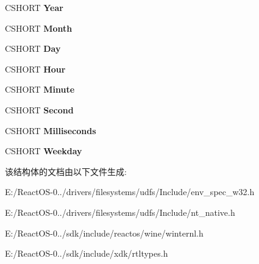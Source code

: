 \begin{DoxyCompactItemize}
\mbox{\label{struct___t_i_m_e___f_i_e_l_d_s_a45f1757e58fb3f019a8ecddf22308880}} 
C\+S\+H\+O\+RT {\bfseries Year}
\item 
\mbox{\label{struct___t_i_m_e___f_i_e_l_d_s_a179c70239b838307d2d3c652c106e402}} 
C\+S\+H\+O\+RT {\bfseries Month}
\item 
\mbox{\label{struct___t_i_m_e___f_i_e_l_d_s_a44a93ddb340afe00b92bf5a56f6ad6e8}} 
C\+S\+H\+O\+RT {\bfseries Day}
\item 
\mbox{\label{struct___t_i_m_e___f_i_e_l_d_s_ab0a40579f998b71d04c84c240c8bb58d}} 
C\+S\+H\+O\+RT {\bfseries Hour}
\item 
\mbox{\label{struct___t_i_m_e___f_i_e_l_d_s_a417cc542cb101d9ab563364d25e10653}} 
C\+S\+H\+O\+RT {\bfseries Minute}
\item 
\mbox{\label{struct___t_i_m_e___f_i_e_l_d_s_adf9dca0d7f296f1bc44b928aa69b5550}} 
C\+S\+H\+O\+RT {\bfseries Second}
\item 
\mbox{\label{struct___t_i_m_e___f_i_e_l_d_s_a2ec268394c8f014a80f1d3282f486f1c}} 
C\+S\+H\+O\+RT {\bfseries Milliseconds}
\item 
\mbox{\label{struct___t_i_m_e___f_i_e_l_d_s_aa2c91b315f827948f096dd8e6d37ee50}} 
C\+S\+H\+O\+RT {\bfseries Weekday}
\end{DoxyCompactItemize}


该结构体的文档由以下文件生成\+:\begin{DoxyCompactItemize}
\item 
E\+:/\+React\+O\+S-\/0../drivers/filesystems/udfs/\+Include/env\+\_\+spec\+\_\+w32.\+h\item 
E\+:/\+React\+O\+S-\/0../drivers/filesystems/udfs/\+Include/nt\+\_\+native.\+h\item 
E\+:/\+React\+O\+S-\/0../sdk/include/reactos/wine/winternl.\+h\item 
E\+:/\+React\+O\+S-\/0../sdk/include/xdk/rtltypes.\+h\end{DoxyCompactItemize}
